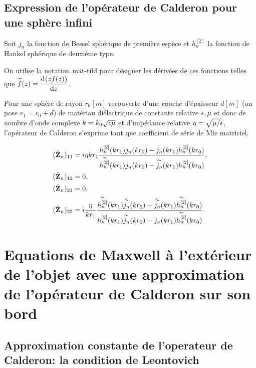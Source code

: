    \subsection{Expression de l'opérateur de Calderon pour une sphère infini}

        Soit \(j_n\) la fonction de Bessel sphérique de première espèce et \(h_n^{[2]}\) la fonction de Hankel sphérique de deuxième type.

        On utilise la notation \gls{mat-tild} pour désigner les dérivées de ces fonctions telles que \(\tilde{f}(z) = \ddp{z}{(zf(z))}\).

        Pour une sphère de rayon \(r_0 [m]\) recouverte d'une couche d'épaisseur \(d [m]\) (on pose \(r_1=r_0 + d\)) de matériau diélectrique de constante relative \(\eps,\mu\) et donc de nombre d'onde complexe \(k = k_0\sqrt{\eps\mu}\) et d'impédance relative \(\eta=\sqrt{{\mu}/{\eps}}\), l'opérateur de Calderon s'exprime tant que coefficient de série de Mie matriciel,

        \begin{align*}
          (\hat \mZ_n)_{11} &=  i\eta kr_1 
            \frac{
                h^{[2]}_n(kr_1)j_n(kr_0)-j_n(kr_1)h^{[2]}_n(kr_0)
              }{
                \tilde{h^{[2]}_n}(kr_1)j_n(kr_0)-\tilde{j_n}(kr_1)h^{[2]}_n(kr_0)
              },
          \\
          (\hat \mZ_n)_{12} &= 0,
          \\
          (\hat \mZ_n)_{21} &= 0,
          \\
          (\hat \mZ_n)_{22} &= i \frac{\eta}{kr_1}
               \frac{
                 \tilde{h^{[2]}_n}(kr_1)\tilde{j_n}(kr_0)-\tilde{j_n}(kr_1)\tilde{h^{[2]}_n}(kr_0)
               }{
                 {h^{[2]}_n}(kr_1)\tilde{j_n}(kr_0)-{j_n}(kr_1)\tilde{h^{[2]}_n}(kr_0)
               }.
        \end{align*}

\section[Problème extérieur et condition limite de Calderon]{Equations de Maxwell à l'extérieur de l'objet avec une approximation de l'opérateur de Calderon sur son bord}

    \subsection{Approximation constante de l'operateur de Calderon: la condition de Leontovich}
        
